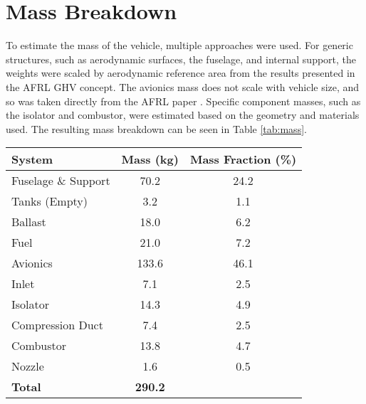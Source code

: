 \section{Mass Breakdown}

To estimate the mass of the vehicle, multiple approaches were used. For generic structures, such as aerodynamic surfaces, the fuselage, and internal support, the weights were scaled by aerodynamic reference area from the results presented in the AFRL GHV concept. The avionics mass does not scale with vehicle size, and so was taken directly from the AFRL paper \cite{ghv}. Specific component masses, such as the isolator and combustor, were estimated based on the geometry and materials used. The resulting mass breakdown can be seen in Table \ref{tab:mass}.

\begin{center}
\begin{tabular}{l c c}
System & Mass (kg) & Mass Fraction (\%)\\
\hline
Fuselage \& Support & 70.2 & 24.2\\
Tanks (Empty) & 3.2 & 1.1\\
Ballast & 18.0 & 6.2 \\
Fuel & 21.0 & 7.2 \\
Avionics & 133.6 & 46.1 \\
Inlet & 7.1 & 2.5 \\
Isolator & 14.3 & 4.9 \\
Compression Duct & 7.4 & 2.5 \\
Combustor & 13.8 & 4.7 \\
Nozzle & 1.6 & 0.5 \\
\hline
\textbf{Total} & \textbf{290.2}
\end{tabular}
\label{tab:mass}
\end{center}